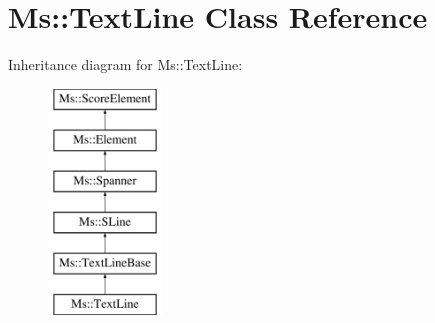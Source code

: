 \hypertarget{class_ms_1_1_text_line}{}\section{Ms\+:\+:Text\+Line Class Reference}
\label{class_ms_1_1_text_line}
Inheritance diagram for Ms\+:\+:Text\+Line\+:\begin{figure}[H]
\begin{center}
\leavevmode
\includegraphics[height=6.000000cm]{class_ms_1_1_text_line}
\end{center}
\end{figure}
